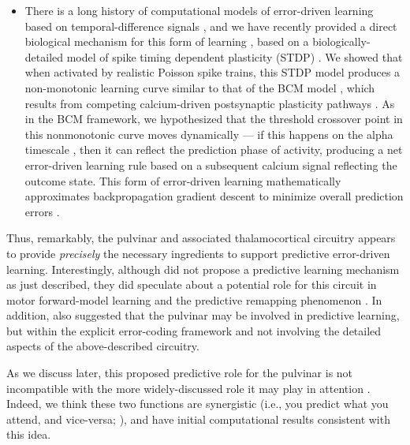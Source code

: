 \documentclass[11pt,twoside]{article}
\newif\myifpdf
\begin{document}
\begin{itemize}
	\item There is a long history of computational models of error-driven learning based on temporal-difference signals \citep{AckleyHintonSejnowski85,OReilly96,BengioMesnardFischerEtAl17,WhittingtonBogacz19,LillicrapSantoroMarrisEtAl20}, and we have recently provided a direct biological mechanism for this form of learning \citep{OReillyMunakataFrankEtAl12}, based on a biologically-detailed model of spike timing dependent plasticity (STDP) \citep{UrakuboHondaFroemkeEtAl08}.  We showed that when activated by realistic Poisson spike trains, this STDP model produces a non-monotonic learning curve similar to that of the BCM model \citep{BienenstockCooperMunro82}, which results from competing calcium-driven postsynaptic plasticity pathways \citep{ShouvalBearCooper02,CooperBear12}.  As in the BCM framework, we hypothesized that the threshold crossover point in this nonmonotonic curve moves dynamically --- if this happens on the alpha timescale \citep{LimMcKeeWoloszynEtAl15}, then it can reflect the prediction phase of activity, producing a net error-driven learning rule based on a subsequent calcium signal reflecting the outcome state.  This form of error-driven learning mathematically approximates backpropagation gradient descent to minimize overall prediction errors \citep{OReilly96}.
\end{itemize}

Thus, remarkably, the pulvinar and associated thalamocortical circuitry appears to provide \emph{precisely} the necessary ingredients to support predictive error-driven learning.  Interestingly, although \citet{ShermanGuillery06} did not propose a predictive learning mechanism as just described, they did speculate about a potential role for this circuit in motor forward-model learning and the predictive remapping phenomenon \citep{ShermanGuillery11,UsreySherman18}.  In addition, \citet{PennartzDoraMuckliEtAl19} also suggested that the pulvinar may be involved in predictive learning, but within the explicit error-coding framework and not involving the detailed aspects of the above-described circuitry.  

As we discuss later, this proposed predictive role for the pulvinar is not incompatible with the more widely-discussed role it may play in attention \citep{LaBergeBuchsbaum90,BenderYouakim01,SnowAllenRafalEtAl09,SaalmannKastner11,ZhouSchaferDesimone16,FiebelkornKastner19}.  Indeed, we think these two functions are synergistic (i.e., you predict what you attend, and vice-versa; \citealp{RichterdeLange19}), and have initial computational results consistent with this idea.
\end{document}
